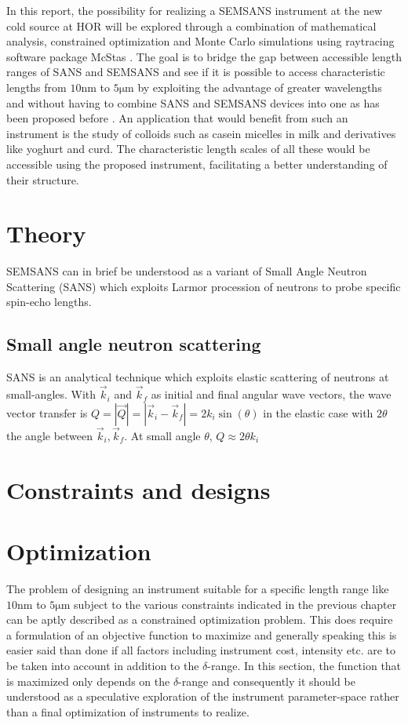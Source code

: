 \documentclass{article}
\newcommand{\targetrange}{$10 \unit{\nano\meter}$ to $5 \unit{\micro\meter}$ }
\begin{document}
In this report, the possibility for realizing a SEMSANS instrument at the new cold source at HOR will be explored through a combination of mathematical analysis, constrained optimization and Monte Carlo simulations using raytracing software package McStas \cite{willendrup2020}. The goal is to bridge the gap between accessible length ranges of SANS and SEMSANS \cite{bouwman2021} and see if it is possible to access characteristic lengths from \targetrange by exploiting the advantage of greater wavelengths and without having to combine SANS and SEMSANS devices into one as has been proposed before \cite{bouwman2011}. An application that would benefit from such an instrument is the study of colloids such as casein micelles in milk and derivatives like yoghurt and curd. The characteristic length scales of all these would be accessible using the proposed instrument, facilitating a better understanding of their structure. 

\section{Theory}
\label{c2:theory}
SEMSANS can in brief be understood as a variant of Small Angle Neutron Scattering (SANS) which exploits Larmor procession of neutrons to probe specific spin-echo lengths.

\subsection{Small angle neutron scattering}
SANS is an analytical technique which exploits elastic scattering of neutrons at small-angles. With $\vec{k}_i$ and $\vec{k}_f$ as initial and final angular wave vectors, the wave vector transfer is $Q = |\vec{Q}| = |\vec{k}_i - \vec{k}_f| = 2k_i\sin(\theta)$ in the elastic case with $2\theta$ the angle between $\vec{k}_i, \vec{k}_f$. At small angle $\theta$, $Q\approx 2\theta k_i$


\section{Constraints and designs}
\label{c3:constraints-and-design}
\newpage
\section{Optimization}
The problem of designing an instrument suitable for a specific length range like \targetrange subject to the various constraints indicated in the previous chapter can be aptly described as a constrained optimization problem. This does require a formulation of an objective function to maximize and generally speaking this is easier said than done if all factors including instrument cost, intensity etc. are to be taken into account in addition to the $\delta$-range. In this section, the function that is maximized only depends on the $\delta$-range and consequently it should be understood as a speculative exploration of the instrument parameter-space rather than a final optimization of instruments to realize. 
\end{document}
